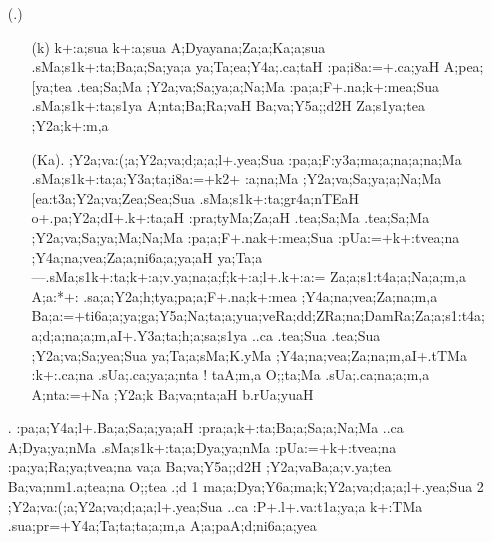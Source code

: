 \begin{spacing}{1.15}
\begin{itemize}
\item[({\sktf 14}.)]
\begin{itemize}
    \item[({\sktf k})] {\sktf k+:a;sua k+:a;sua {A;Dya}{ya}{na};Za;a;Ka;a;sua}
{\sktf .sMa;s1k+:ta;Ba;a;Sa;ya;a ya;Ta;ea;Y4a;.ca;taH
:pa;i8a:=+.ca;yaH A;pea;[ya;tea .tea;Sa;Ma ;Y2a;va;Sa;ya;a;Na;Ma :pa;a;F+.na;k+:mea;Sua
.sMa;s1k+:ta;s1ya A;nta;Ba;Ra;vaH
Ba;va;Y5a;;d2H Za;s1ya;tea ;Y2a;k+:m,a}
                
    \item[({\sktf Ka}).]
{\sktf ;Y2a;va:(;a;Y2a;va;d;a;a;l+.yea;Sua
:pa;a;F:y3a;ma;a;na;a;na;Ma .sMa;s1k+:ta;a;Y3a;ta;i8a:=+k2+%
:a;na;Ma ;Y2a;va;Sa;ya;a;Na;Ma [ea:t3a;Y2a;va;Zea;Sea;Sua
.sMa;s1k+:ta;gr4a;nTEaH o+.pa;Y2a;dI+.k+:ta;aH :pra;tyMa;Za;aH .tea;Sa;Ma
.tea;Sa;Ma ;Y2a;va;Sa;ya;Ma;Na;Ma :pa;a;F+.na\ZF{-}k+:mea;Sua
:pUa:=+k+:tvea;na ;Y4a;na;vea;Za;a;ni6a;a;ya;aH\ZF{,}
ya;Ta;a}{\rm---}{\sktf .sMa;s1k+:ta;k+:a;v.ya;na;a;f;k+:a;l+.k+:a:=%
\ZF{-}Za;a;s1:t4a;a;Na;a;m,a A;a:*+:%
\ZF{-}.sa;a;Y2a;h;tya;pa;a;F+.na;k+:mea ;Y4a;na;vea;Za;na;m,a\ZF{,}
Ba;a:=+ti6a;a;ya;ga;Y5a;Na;ta;a;yua;veRa;d\ZF{-}d;ZRa;na\ZF{-};DamRa;Za;a;s1:t4a;a;d;a;na;a;m,a\break I+.Y3a;ta;h;a;sa;s1ya ..ca
.tea;Sua .tea;Sua ;Y2a;va;Sa;yea;Sua ya;Ta;a;sMa;K.yMa
;Y4a;na;vea;Za;na;m,a\ZF{---}I+.tTMa :k+:.ca;na
.sUa;.ca;ya;a;nta} ! {\sktf taA;m,a O;;ta;Ma .sUa;.ca;na;a;m,a A;nta:=+Na ;Y2a;k
Ba;va;nta;aH b.rUa;yuaH}
     \end{itemize}
              
 \item[{\sktf 15}.]  
{\sktf :pa;a;Y4a;l+.Ba;a;Sa;a;ya;aH :pra;a;k+:ta;Ba;a;Sa;a;Na;Ma ..ca A;Dya;ya;nMa .sMa;s1k+:ta;a;Dya;ya;nMa :pUa:=+k+:tvea;na :pa;ya;Ra;ya;tvea;na va;a
Ba;va;Y5a;;d2H ;Y2a;vaBa;a;v.ya;tea Ba;va;nm1.a;tea;na O;;tea .;d
\ZF{(}1\ZF{)} ma;a;Dya;Y6a;ma;k\ZF{-};Y2a;va;d;a;a;l+.yea;Sua
\ZF{(}2\ZF{)} ;Y2a;va:(;a;Y2a;va;d;a;a;l+.yea;Sua ..ca
:P+.l+.va:t1a;ya;a k+:TMa .sua;pr=+Y4a;Ta;ta;ta;a;m,a A;a;paA;d;ni6a;a;yea} 
 

\end{itemize}
\end{spacing}
